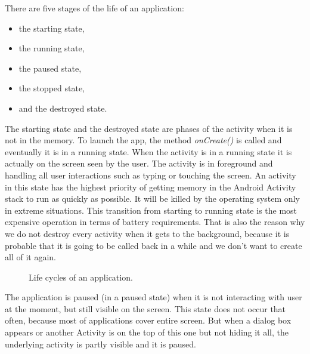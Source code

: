 There are five stages of the life of an application:
\begin{itemize}
\item the starting state,
\item the running state,
\item the paused state,
\item the stopped state,
\item and the destroyed state.
\end{itemize}

The starting state and the destroyed state are phases of the activity when it is not in the memory.
To launch the app, the method \emph{onCreate()} is called and eventually it is in a running state.
When the activity is in a running state it is actually on the screen seen by the user.
The activity is in foreground and handling all user interactions such as typing or touching the screen.
An activity in this state has the highest priority of getting memory in the Android Activity stack to run as quickly as possible.
It will be killed by the operating system only in extreme situations.
This transition from starting to running state is the most expensive operation in terms of battery requirements.
That is also the reason why we do not destroy every activity when it gets to the background, 
because it is probable that it is going to be called back in a while and we don't want to create all of it again.

\begin{figure}[h!]
    \caption{Life cycles of an application.}
\end{figure}

The application is paused (in a paused state) when it is not interacting with user at the moment, but still visible on the screen.
This state does not occur that often, because most of applications cover entire screen.
But when a dialog box appears or another Activity is on the top of this one but not hiding it all, the underlying activity is partly visible and it is paused.


